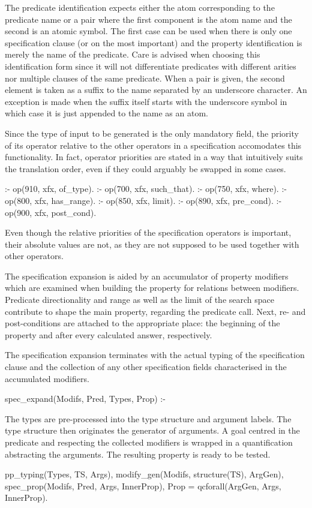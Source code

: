 The predicate identification expects either the atom corresponding to
the predicate name or a pair where the first component is the atom name
and the second is an atomic symbol.
%
The first case can be used when there is only one specification clause
(or on the most important) and the property identification is merely the
name of the predicate.
%
Care is advised when choosing this identification form since it will not
differentiate predicates with different arities nor multiple clauses of
the same predicate.
%
When a pair is given, the second element is taken as a suffix to the
name separated by an underscore character.
%
An exception is made when the suffix itself starts with the underscore
symbol in which case it is just appended to the name as an atom.


Since the type of input to be generated is the only mandatory field, the
priority of its operator relative to the other operators in a
specification accomodates this functionality.
%
In fact, operator priorities are stated in a way that intuitively suits the
translation order, even if they could arguably be swapped in some cases.
%
\begin{yapcode}
 :- op(910, xfx, of_type).
 :- op(700, xfx, such_that).
 :- op(750, xfx, where).
 :- op(800, xfx, has_range).
 :- op(850, xfx, limit).
 :- op(890, xfx, pre_cond).
 :- op(900, xfx, post_cond).
\end{yapcode}
%
Even though the relative priorities of the specification operators is
important, their absolute values are not, as they are not supposed to
be used together with other
\Prolog{} operators.


The specification expansion is aided by an accumulator of property
modifiers which are examined when building the property for relations
between modifiers.
%
Predicate directionality and range as well as the limit of the search
space contribute to shape the main property, regarding the predicate
call.
%
Next, re- and post-conditions are attached to the appropriate place: the
beginning of the property and after every calculated answer,
respectively.


The specification expansion terminates with the actual typing of the
specification clause and the collection of any other specification fields
characterised in the accumulated modifiers.
%
\begin{yapcode}
 spec_expand(Modifs, Pred, Types, Prop) :-
\end{yapcode}
%
The types are pre-processed into the type structure and argument labels.
%
The type structure then originates the generator of arguments.
%
A goal centred in the predicate and respecting the collected modifiers
is wrapped in a quantification abstracting the arguments.
%
The resulting property is ready to be tested.
%
\begin{yapcode}
   pp_typing(Types, TS, Args),
   modify_gen(Modifs, structure(TS), ArgGen),
   spec_prop(Modifs, Pred, Args, InnerProp),
   Prop = qcforall(ArgGen, Args, InnerProp).
\end{yapcode}



